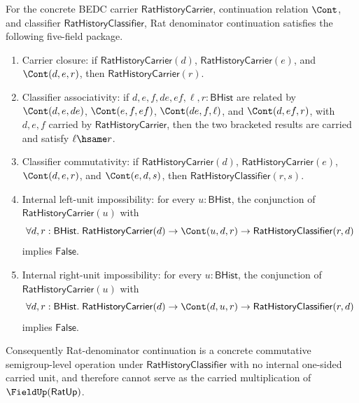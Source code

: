 \begin{theorem}
\label{thm:field-rat-denominator-continuation-commutative-semigroup-obstruction-package}
For the concrete BEDC carrier $\mathsf{RatHistoryCarrier}$, continuation
relation $\Cont$, and classifier $\mathsf{RatHistoryClassifier}$, Rat
denominator continuation satisfies the following five-field package.
\begin{enumerate}
\item Carrier closure: if $\mathsf{RatHistoryCarrier}(d)$,
$\mathsf{RatHistoryCarrier}(e)$, and $\Cont(d,e,r)$, then
$\mathsf{RatHistoryCarrier}(r)$.
\item Classifier associativity: if $d,e,f,de,ef,\ell,r:\mathsf{BHist}$ are
related by $\Cont(d,e,de)$, $\Cont(e,f,ef)$, $\Cont(de,f,\ell)$, and
$\Cont(d,ef,r)$, with $d,e,f$ carried by $\mathsf{RatHistoryCarrier}$, then the
two bracketed results are carried and satisfy $\ell\hsame r$.
\item Classifier commutativity: if $\mathsf{RatHistoryCarrier}(d)$,
$\mathsf{RatHistoryCarrier}(e)$, $\Cont(d,e,r)$, and $\Cont(e,d,s)$, then
$\mathsf{RatHistoryClassifier}(r,s)$.
\item Internal left-unit impossibility: for every $u:\mathsf{BHist}$, the
conjunction of $\mathsf{RatHistoryCarrier}(u)$ with
$$
\forall d,r:\mathsf{BHist}.\;
\mathsf{RatHistoryCarrier}(d)\to
\Cont(u,d,r)\to
\mathsf{RatHistoryClassifier}(r,d)
$$
implies $\mathsf{False}$.
\item Internal right-unit impossibility: for every $u:\mathsf{BHist}$, the
conjunction of $\mathsf{RatHistoryCarrier}(u)$ with
$$
\forall d,r:\mathsf{BHist}.\;
\mathsf{RatHistoryCarrier}(d)\to
\Cont(d,u,r)\to
\mathsf{RatHistoryClassifier}(r,d)
$$
implies $\mathsf{False}$.
\end{enumerate}
Consequently Rat-denominator continuation is a concrete commutative
semigroup-level operation under $\mathsf{RatHistoryClassifier}$ with no internal
one-sided carried unit, and therefore cannot serve as the carried multiplication
of $\FieldUp(\mathsf{RatUp})$.
\end{theorem}
